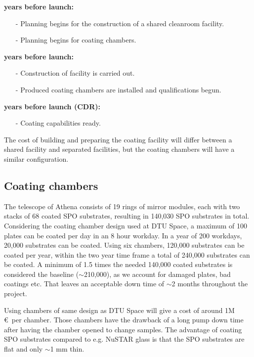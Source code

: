 \begin{description}[itemsep=1.5pt,parsep=1pt]
	\item[9] \textbf{years before launch:}
		\begin{itemize}[itemsep=1.5pt,parsep=1pt]
		\item[-] Planning begins for the construction of a shared cleanroom facility.
		\item[-] Planning begins for coating chambers.
		\end{itemize}
	\item[7-8] \textbf{years before launch:}
		\begin{itemize}[itemsep=1.5pt,parsep=1pt]
		\item[-] Construction of facility is carried out.
		\item[-] Produced coating chambers are installed and qualifications begun.
		\end{itemize}
	\item[6] \textbf{years before launch (CDR):}
		\begin{itemize}[itemsep=1.5pt,parsep=1pt]
		\item[-] Coating capabilities ready.
		\end{itemize}
\end{description}

The cost of building and preparing the coating facility will differ between a shared facility and separated facilities, but the coating chambers will have a similar configuration.

\subsection{Coating chambers}\label{sec:chambers}
The telescope of Athena consists of 19 rings of mirror modules, each with two stacks of 68 coated SPO substrates, resulting in 140,030 SPO substrates in total. Considering the coating chamber design used at DTU Space, a maximum of 100 plates can be coated per day in an 8 hour workday. In a year of 200 workdays, 20,000 substrates can be coated. Using six chambers, 120,000 substrates can be coated per year, within the two year time frame a total of 240,000 substrates can be coated. A minimum of 1.5 times the needed 140,000 coated substrates is considered the baseline ($\sim$210,000), as we account for damaged plates, bad coatings etc. That leaves an acceptable down time of $\sim$2 months throughout the project.

Using chambers of same design as DTU Space will give a cost of around 1M \euro\ per chamber. Those chambers have the drawback of a long pump down time after having the chamber opened to change samples. The advantage of coating SPO substrates compared to e.g. NuSTAR glass is that the SPO substrates are flat and only $\sim$1 mm thin.

